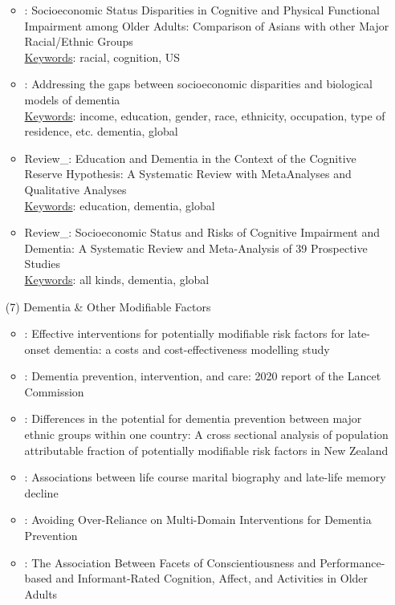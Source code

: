 \documentclass[12pt]{article}
\begin{document}
\begin{itemize}
\begin{itemize}
        \item \cite{wang2023socioeconomic}: Socioeconomic Status Disparities in Cognitive and Physical Functional Impairment among Older Adults: Comparison of Asians with other Major Racial/Ethnic Groups \\
        \uline{Keywords}: racial, cognition, US
        \item \cite{ibanez2023addressing}: Addressing the gaps between socioeconomic disparities and biological models of dementia \\
        \uline{Keywords}: income, education, gender, race, ethnicity, occupation, type of residence, etc. dementia, global
        \item Review\_\cite{meng2012education}: Education and Dementia in the Context of the Cognitive Reserve Hypothesis: A Systematic Review with MetaAnalyses and Qualitative Analyses \\
        \uline{Keywords}: education, dementia, global
        \item Review\_\cite{wang2023socioeconomic}: Socioeconomic Status and Risks of Cognitive Impairment and Dementia: A Systematic Review and Meta-Analysis of 39 Prospective Studies \\ 
        \uline{Keywords}: all kinds, dementia, global
    \end{itemize}
    \item[(7)] Dementia \& Other Modifiable Factors
    \begin{itemize}
        \item \cite{mukadam2020effective}: Effective interventions for potentially modifiable risk factors for late-onset dementia: a costs and cost-effectiveness modelling study
        \item \cite{livingston2020dementia}: Dementia prevention, intervention, and care: 2020 report of the Lancet Commission
        \item \cite{ma2021differences}: Differences in the potential for dementia prevention between major ethnic groups within one country: A cross sectional analysis of population attributable fraction of potentially modifiable risk factors in New Zealand
        \item \cite{zaheed2021associations}: Associations between life course marital biography and late-life memory decline
        \item \cite{daly2022avoiding}: Avoiding Over-Reliance on Multi-Domain Interventions for Dementia Prevention
        \item \cite{sutin2022association}: The Association Between Facets of Conscientiousness and Performance-based and Informant-Rated Cognition, Affect, and Activities in Older Adults

\end{itemize}
\end{itemize}
\end{document}
